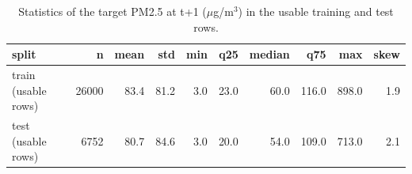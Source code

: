 \begin{table}[t]
\centering
\small
\caption{Statistics of the target PM2.5 at t+1 ($\mu$g/m$^3$) in the usable training and test rows.}
\label{tab:table_1b_target_statistics}
\begin{tabular}{lrrrrrrrrr}
\toprule
split & n & mean & std & min & q25 & median & q75 & max & skew \\
\midrule
train (usable rows) & 26000 & 83.4 & 81.2 & 3.0 & 23.0 & 60.0 & 116.0 & 898.0 & 1.9 \\
test (usable rows) & 6752 & 80.7 & 84.6 & 3.0 & 20.0 & 54.0 & 109.0 & 713.0 & 2.1 \\
\bottomrule
\end{tabular}
\end{table}
